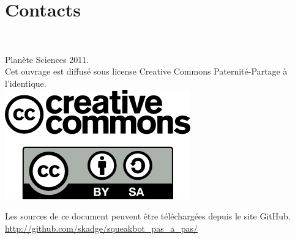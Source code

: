 \documentclass[a4paper,12pt]{book}
\begin{document}
\section{Contacts}

\printglossaries

\clearpage
\thispagestyle{empty}
~
\vfill
\begin{center}
	Planète Sciences 2011.\\
	Cet ouvrage est diffusé sous license Creative Commons Paternité-Partage à l'identique.\\
	\vspace{2cm}
	\includegraphics[scale=0.5]{logo_cc.png}
\end{center}

\vfill

\begin{center}
	Les sources de ce document peuvent être téléchargées depuis le site GitHub.
	\url{http://github.com/skadge/squeakbot_pas_a_pas/}
\end{center}

\vfill
\end{document}
